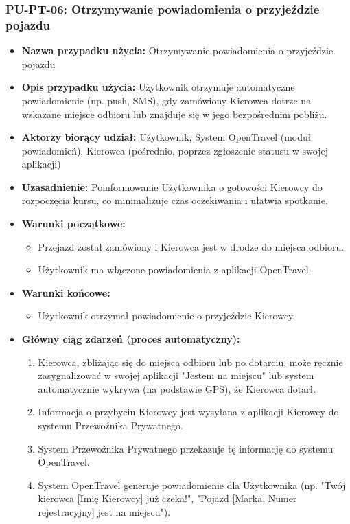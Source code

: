 \documentclass[a4paper,12pt]{article}
\begin{document}
\subsubsection{PU-PT-06: Otrzymywanie powiadomienia o przyjeździe pojazdu}
\begin{itemize}
    \item \textbf{Nazwa przypadku użycia:} Otrzymywanie powiadomienia o przyjeździe pojazdu
    \item \textbf{Opis przypadku użycia:} Użytkownik otrzymuje automatyczne powiadomienie (np. push, SMS), gdy zamówiony Kierowca dotrze na wskazane miejsce odbioru lub znajduje się w jego bezpośrednim pobliżu.
    \item \textbf{Aktorzy biorący udział:} Użytkownik, System OpenTravel (moduł powiadomień), Kierowca (pośrednio, poprzez zgłoszenie statusu w swojej aplikacji)
    \item \textbf{Uzasadnienie:} Poinformowanie Użytkownika o gotowości Kierowcy do rozpoczęcia kursu, co minimalizuje czas oczekiwania i ułatwia spotkanie.
    \item \textbf{Warunki początkowe:}
        \begin{itemize}
            \item Przejazd został zamówiony i Kierowca jest w drodze do miejsca odbioru.
            \item Użytkownik ma włączone powiadomienia z aplikacji OpenTravel.
        \end{itemize}
    \item \textbf{Warunki końcowe:}
        \begin{itemize}
            \item Użytkownik otrzymał powiadomienie o przyjeździe Kierowcy.
        \end{itemize}
    \item \textbf{Główny ciąg zdarzeń (proces automatyczny):}
        \begin{enumerate}
            \item Kierowca, zbliżając się do miejsca odbioru lub po dotarciu, może ręcznie zasygnalizować w swojej aplikacji "Jestem na miejscu" lub system automatycznie wykrywa (na podstawie GPS), że Kierowca dotarł.
            \item Informacja o przybyciu Kierowcy jest wysyłana z aplikacji Kierowcy do systemu Przewoźnika Prywatnego.
            \item System Przewoźnika Prywatnego przekazuje tę informację do systemu OpenTravel.
            \item System OpenTravel generuje powiadomienie dla Użytkownika (np. "Twój kierowca [Imię Kierowcy] już czeka!", "Pojazd [Marka, Numer rejestracyjny] jest na miejscu").

\end{enumerate}
\end{itemize}
\end{document}
